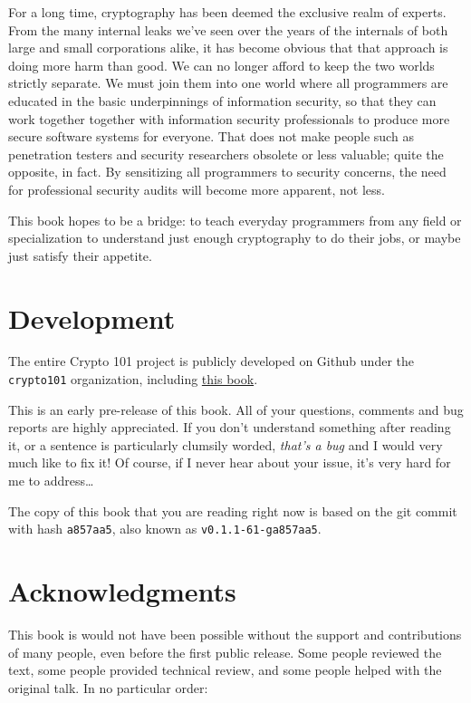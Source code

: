 \documentclass[11pt,ebook,table,dvipsnames]{memoir}
\begin{document}
For a long time, cryptography has been deemed the exclusive realm of
experts. From the many internal leaks we've seen over the years of the
internals of both large and small corporations alike, it has become
obvious that that approach is doing more harm than good. We can no
longer afford to keep the two worlds strictly separate. We must join
them into one world where all programmers are educated in the basic
underpinnings of information security, so that they can work together
together with information security professionals to produce more
secure software systems for everyone. That does not make people such
as penetration testers and security researchers obsolete or less
valuable; quite the opposite, in fact. By sensitizing all programmers
to security concerns, the need for professional security audits will
become more apparent, not less.

This book hopes to be a bridge: to teach everyday programmers from any
field or specialization to understand just enough cryptography to do
their jobs, or maybe just satisfy their appetite.
\chapter{Development}
\label{sec-1-2}

The entire Crypto 101 project is publicly developed on Github under the
\verb~crypto101~ organization, including \href{https://www.github.com/crypto101/book}{this book}.

This is an early pre-release of this book. All of your questions,
comments and bug reports are highly appreciated. If you don't
understand something after reading it, or a sentence is particularly
clumsily worded, \emph{that's a bug} and I would very much like to fix it!
Of course, if I never hear about your issue, it's very hard for me to
address\ldots{}

The copy of this book that you are reading right now is based on the
git commit with hash \texttt{a857aa5}, also known as \texttt{v0.1.1-61-ga857aa5}.
\chapter{Acknowledgments}
\label{sec-1-3}

This book is would not have been possible without the support and
contributions of many people, even before the first public release.
Some people reviewed the text, some people provided technical review,
and some people helped with the original talk. In no particular order:
\end{document}
